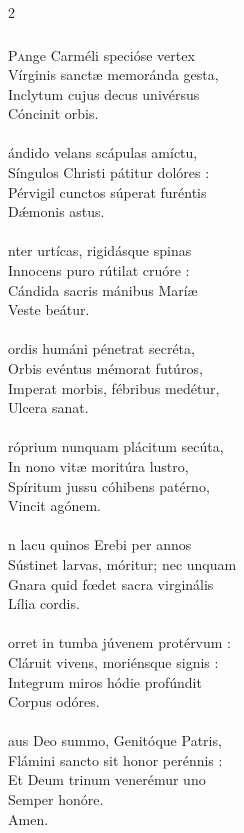 \documentclass[9pt,twoside]{extarticle}
\begin{document}
\begin{multicols}{2}
{{\subsubsection*{\center {}}
\lettrine{P}ange Carméli specióse vertex\\
Vírginis sanctæ memoránda gesta,\\
Inclytum cujus decus univérsus\\
Cóncinit orbis.\\
\\
ándido velans scápulas amíctu,\\
Síngulos Christi pátitur dolóres :\\
Pérvigil cunctos súperat furéntis\\
Dǽmonis astus.\\
\\
nter urtícas, rigidásque spinas\\
Innocens puro rútilat cruóre :\\
Cándida sacris mánibus Maríæ\\
Veste beátur.\\
\\
ordis humáni pénetrat secréta,\\
Orbis evéntus mémorat futúros,\\
Imperat morbis, fébribus medétur,\\
Ulcera sanat.\\
\\
róprium nunquam plácitum secúta,\\
In nono vitæ moritúra lustro,\\
Spíritum jussu cóhibens patérno,\\
Vincit agónem.\\
\\
n lacu quinos Erebi per annos\\
Sústinet larvas, móritur; nec unquam\\
Gnara quid fœdet sacra virginális\\
Lília cordis.\\
\\
orret in tumba júvenem protérvum :\\
Cláruit vivens, moriénsque signis :\\
Integrum miros hódie profúndit\\
Corpus odóres.\\
\\
aus Deo summo, Genitóque Patris,\\
Flámini sancto sit honor perénnis :\\
Et Deum trinum venerémur uno\\
Semper honóre.\\
Amen.

}}
\end{multicols}
\end{document}
